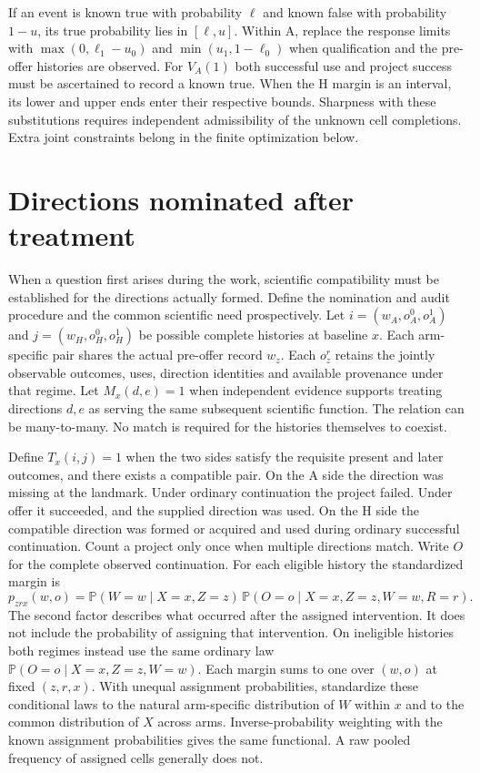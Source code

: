 \documentclass[11pt,a4paper]{article}
\newcommand{\Prob}{\mathbb{P}}
\begin{document}
If an event is known true with probability $\ell$ and known false with probability $1-u$, its true probability lies in $[\ell,u]$. Within A, replace the response limits with $\max(0,\ell_1-u_0)$ and $\min(u_1,1-\ell_0)$ when qualification and the pre-offer histories are observed. For $V_A(1)$ both successful use and project success must be ascertained to record a known true. When the H margin is an interval, its lower and upper ends enter their respective bounds. Sharpness with these substitutions requires independent admissibility of the unknown cell completions. Extra joint constraints belong in the finite optimization below.

\section{Directions nominated after treatment}\label{sec:transport}
When a question first arises during the work, scientific compatibility must be established for the directions actually formed. Define the nomination and audit procedure and the common scientific need prospectively. Let $i=(w_A,o_A^0,o_A^1)$ and $j=(w_H,o_H^0,o_H^1)$ be possible complete histories at baseline $x$. Each arm-specific pair shares the actual pre-offer record $w_z$. Each $o_z^r$ retains the jointly observable outcomes, uses, direction identities and available provenance under that regime. Let $M_x(d,e)=1$ when independent evidence supports treating directions $d,e$ as serving the same subsequent scientific function. The relation can be many-to-many. No match is required for the histories themselves to coexist.

Define $T_x(i,j)=1$ when the two sides satisfy the requisite present and later outcomes, and there exists a compatible pair. On the A side the direction was missing at the landmark. Under ordinary continuation the project failed. Under offer it succeeded, and the supplied direction was used. On the H side the compatible direction was formed or acquired and used during ordinary successful continuation. Count a project only once when multiple directions match. Write $O$ for the complete observed continuation. For each eligible history the standardized margin is
\[
p_{zrx}(w,o)=\Prob(W=w\mid X=x,Z=z)\,
\Prob(O=o\mid X=x,Z=z,W=w,R=r).
\]
The second factor describes what occurred after the assigned intervention. It does not include the probability of assigning that intervention. On ineligible histories both regimes instead use the same ordinary law $\Prob(O=o\mid X=x,Z=z,W=w)$. Each margin sums to one over $(w,o)$ at fixed $(z,r,x)$. With unequal assignment probabilities, standardize these conditional laws to the natural arm-specific distribution of $W$ within $x$ and to the common distribution of $X$ across arms. Inverse-probability weighting with the known assignment probabilities gives the same functional. A raw pooled frequency of assigned cells generally does not.
\end{document}

